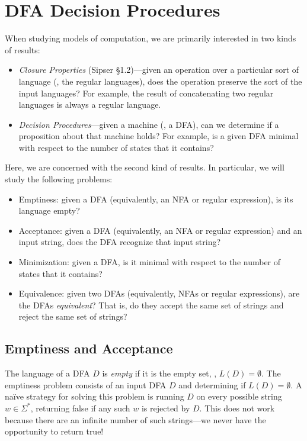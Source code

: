\documentclass[11pt]{book}
\begin{document}
\section*{DFA Decision Procedures}

When studying models of computation, we are primarily interested in two kinds of results:
\begin{itemize}[itemsep=0pt]
  \item \emph{Closure Properties} (Sipser §1.2)---given an operation over a particular sort of language (\eg, the regular languages), does the operation preserve the sort of the input languages?
    For example, the result of concatenating two regular languages is always a regular language.
  \item \emph{Decision Procedures}---given a machine (\eg, a DFA), can we determine if a proposition about that machine holds?
    For example, is a given DFA minimal with respect to the number of states that it contains?
\end{itemize}
Here, we are concerned with the second kind of results.
In particular, we will study the following problems:
\begin{itemize}[itemsep=0pt]
  \item Emptiness: given a DFA (equivalently, an NFA or regular expression), is its language empty?
  \item Acceptance: given a DFA (equivalently, an NFA or regular expression) and an input string, does the DFA recognize that input string?
  \item Minimization: given a DFA, is it minimal with respect to the number of states that it contains?
  \item Equivalence: given two DFAs (equivalently, NFAs or regular expressions), are the DFAs \emph{equivalent}?
    That is, do they accept the same set of strings and reject the same set of strings?
\end{itemize}

\subsection*{Emptiness and Acceptance}

The language of a DFA $D$ is \emph{empty} if it is the empty set, \ie, $L(D) = \emptyset$.
The emptiness problem consists of an input DFA $D$ and determining if $L(D) = \emptyset$.
A na\"{i}ve strategy for solving this problem is running $D$ on every possible string $w \in \Sigma^*$, returning false if any such $w$ is rejected by $D$.
This does not work because there are an infinite number of such strings---we never have the opportunity to return true!
\end{document}

